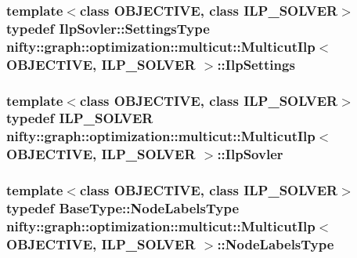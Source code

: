 \subsubsection[{Ilp\+Settings}]{\setlength{\rightskip}{0pt plus 5cm}template$<$class O\+B\+J\+E\+C\+T\+I\+V\+E, class I\+L\+P\+\_\+\+S\+O\+L\+V\+E\+R$>$ typedef Ilp\+Sovler\+::\+Settings\+Type {\bf nifty\+::graph\+::optimization\+::multicut\+::\+Multicut\+Ilp}$<$ O\+B\+J\+E\+C\+T\+I\+V\+E, I\+L\+P\+\_\+\+S\+O\+L\+V\+E\+R $>$\+::{\bf Ilp\+Settings}}\label{classnifty_1_1graph_1_1optimization_1_1multicut_1_1MulticutIlp_a80c305a79499dcbf64972c3da063425d}
\hypertarget{classnifty_1_1graph_1_1optimization_1_1multicut_1_1MulticutIlp_ac85f089fd12431bd80f33c83dd45bdc7}{}
\subsubsection[{Ilp\+Sovler}]{\setlength{\rightskip}{0pt plus 5cm}template$<$class O\+B\+J\+E\+C\+T\+I\+V\+E, class I\+L\+P\+\_\+\+S\+O\+L\+V\+E\+R$>$ typedef I\+L\+P\+\_\+\+S\+O\+L\+V\+E\+R {\bf nifty\+::graph\+::optimization\+::multicut\+::\+Multicut\+Ilp}$<$ O\+B\+J\+E\+C\+T\+I\+V\+E, I\+L\+P\+\_\+\+S\+O\+L\+V\+E\+R $>$\+::{\bf Ilp\+Sovler}}\label{classnifty_1_1graph_1_1optimization_1_1multicut_1_1MulticutIlp_ac85f089fd12431bd80f33c83dd45bdc7}
\hypertarget{classnifty_1_1graph_1_1optimization_1_1multicut_1_1MulticutIlp_acc09a2ea6cee89d05a3edf7f6681431c}{}
\subsubsection[{Node\+Labels\+Type}]{\setlength{\rightskip}{0pt plus 5cm}template$<$class O\+B\+J\+E\+C\+T\+I\+V\+E, class I\+L\+P\+\_\+\+S\+O\+L\+V\+E\+R$>$ typedef {\bf Base\+Type\+::\+Node\+Labels\+Type} {\bf nifty\+::graph\+::optimization\+::multicut\+::\+Multicut\+Ilp}$<$ O\+B\+J\+E\+C\+T\+I\+V\+E, I\+L\+P\+\_\+\+S\+O\+L\+V\+E\+R $>$\+::{\bf Node\+Labels\+Type}}\label{classnifty_1_1graph_1_1optimization_1_1multicut_1_1MulticutIlp_acc09a2ea6cee89d05a3edf7f6681431c}
\hypertarget{classnifty_1_1graph_1_1optimization_1_1multicut_1_1MulticutIlp_a1c9fe5899608fc9c8e32bde6648c8278}{}
